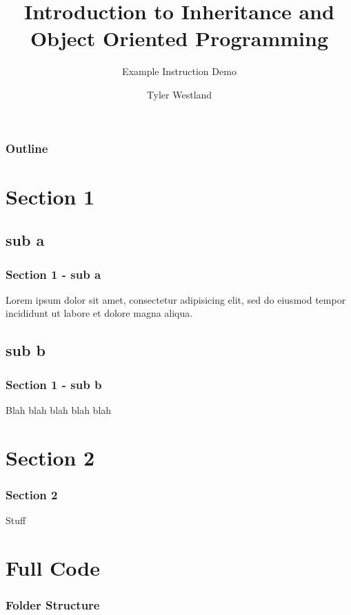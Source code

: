 \documentclass{beamer}
\title{Introduction to Inheritance and Object Oriented Programming}
\subtitle{Example Instruction Demo}
\author{Tyler Westland}
\date{}
\begin{document}
 
\begin{frame}
\titlepage
\end{frame}

\begin{frame}
\frametitle{Outline}
\tableofcontents
\end{frame}


%

\section{Section 1}
\subsection{sub a}


\begin{frame}
\frametitle{Section 1 - sub a}
Lorem ipsum dolor sit amet, consectetur adipisicing elit, sed do eiusmod tempor incididunt ut labore et dolore magna aliqua.
\end{frame}

\subsection{sub b}

\begin{frame}
\frametitle{Section 1 - sub b}
Blah blah blah blah blah
\end{frame}

\section{Section 2}
\begin{frame}
\frametitle{Section 2}
Stuff
\end{frame}

\appendix
\section{Full Code}
\begin{frame}
\frametitle{Folder Structure}
\end{frame}
\end{document}
